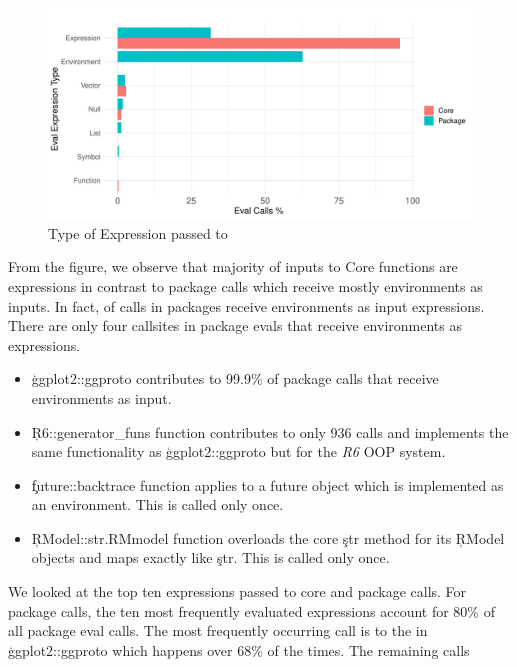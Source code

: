 \documentclass[conference]{IEEEtran}
\begin{document}
\begin{figure}[!h]
	\centering
  \includegraphics[width=\columnwidth]{eval-expression-kind}
  \caption{Type of Expression passed to \eval} \label{fig:eval-expression-kind}
\end{figure}

From the figure, we observe that majority of inputs to Core \eval functions are
expressions in contrast to package \eval calls which receive mostly environments
as inputs. In fact, \PackageEnvironmentInputEvalCallPerc of \eval calls in
packages receive environments as input expressions. There are only four
callsites in package evals that receive environments as expressions.
\begin{itemize}
\item \c{ggplot2::ggproto} contributes to 99.9\% of package \eval calls that
receive environments as input.
\item \c{R6::generator_funs} function contributes to only 936 \eval calls and
implements the same functionality as \c{ggplot2::ggproto} but for the \emph{R6}
OOP system.
\item \c{future::backtrace} function applies \eval to a future object which is
implemented as an environment. This is called only once.
\item \c{RModel::str.RMmodel} function overloads the core \c{str} method for its
\c{RModel} objects and maps \eval exactly like \c{str}. This is called only
once.
\end{itemize}

We looked at the top ten expressions passed to core and
package \eval calls.
For package \eval calls, the ten most frequently evaluated expressions account
for 80\% of all package eval calls. The most frequently occurring call is to the
\eval in \c{ggplot2::ggproto} which happens over 68\% of the times. The
remaining calls


\end{document}
